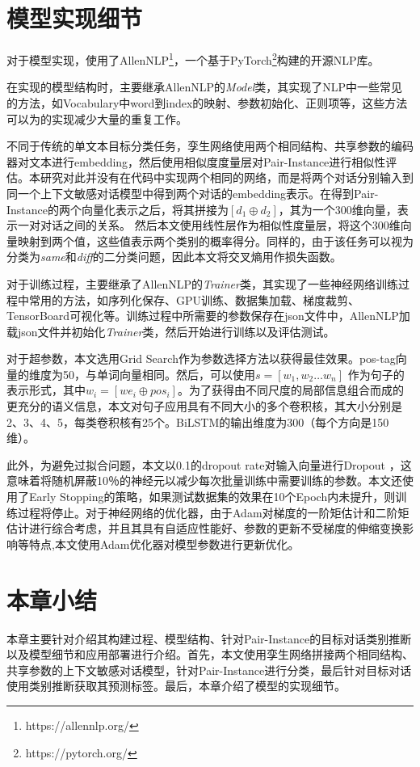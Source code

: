 \section{{\tool}模型实现细节}

对于模型实现，{\tool}使用了AllenNLP\footnote{https://allennlp.org/}，一个基于PyTorch\footnote{https://pytorch.org/}构建的开源NLP库。

在实现{\tool}的模型结构时，主要继承AllenNLP的\textit{Model}类，其实现了NLP中一些常见的方法，如Vocabulary中word到index的映射、参数初始化、正则项等，这些方法可以为{\tool}的实现减少大量的重复工作。

不同于传统的单文本目标分类任务，孪生网络使用两个相同结构、共享参数的编码器对文本进行embedding，然后使用相似度度量层对Pair-Instance进行相似性评估。本研究对此并没有在代码中实现两个相同的网络，而是将两个对话分别输入到同一个上下文敏感对话模型{\dm}中得到两个对话的embedding表示。在得到Pair-Instance的两个向量化表示之后，将其拼接为$[{d_1}\oplus {d_2}]$，其为一个300维向量，表示一对对话之间的关系。
然后本文使用线性层作为相似性度量层，将这个300维向量映射到两个值，这些值表示两个类别的概率得分。同样的，由于该任务可以视为分类为\textit{same}和\textit{diff}的二分类问题，因此本文将交叉熵用作损失函数。

对于训练过程，主要继承了AllenNLP的\textit{Trainer}类，其实现了一些神经网络训练过程中常用的方法，如序列化保存、GPU训练、数据集加载、梯度裁剪、TensorBoard可视化等。训练过程中所需要的参数保存在json文件中，AllenNLP加载json文件并初始化\textit{Trainer}类，然后开始进行训练以及评估测试。

对于超参数，本文选用Grid Search\cite{Bergstra2012Random}作为参数选择方法以获得最佳效果。pos-tag向量的维度为50，与单词向量相同。然后，可以使用$s=[w_1,w_2\dots w_n]$ 作为句子的表示形式，其中$w_i=[we_i\oplus pos_i]$。为了获得由不同尺度的局部信息组合而成的更充分的语义信息，本文对句子应用具有不同大小的多个卷积核，其大小分别是2、3、4、5，每类卷积核有25个。BiLSTM的输出维度为300（每个方向是150维）。

此外，为避免过拟合问题，本文以0.1的dropout rate对输入向量进行Dropout \cite{srivastava2014dropout}，这意味着将随机屏蔽10％的神经元以减少每次批量训练中需要训练的参数。本文还使用了Early Stopping\cite{prechelt1998early}的策略，如果测试数据集的效果在10个Epoch内未提升，则训练过程将停止。对于神经网络的优化器，由于Adam\cite{kingma2014adam}对梯度的一阶矩估计和二阶矩估计进行综合考虑，并且其具有自适应性能好、参数的更新不受梯度的伸缩变换影响等特点,本文使用Adam优化器对模型参数进行更新优化。




\section{本章小结}

本章主要针对{\tool}介绍其构建过程、模型结构、针对Pair-Instance的目标对话类别推断以及模型细节和应用部署进行介绍。首先，本文使用孪生网络拼接两个相同结构、共享参数的上下文敏感对话模型{\dm}，针对Pair-Instance进行分类，最后针对目标对话使用类别推断获取其预测标签。最后，本章介绍了模型的实现细节。